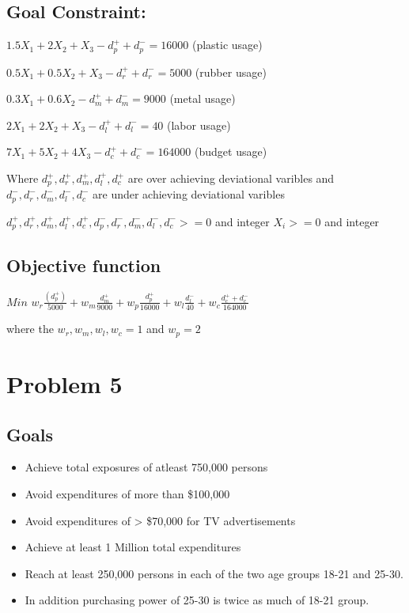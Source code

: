 \documentclass[]{article}
\providecommand{\tightlist}{%
  \setlength{\itemsep}{0pt}\setlength{\parskip}{0pt}}
\begin{document}
\subsection{Goal Constraint:}\label{goal-constraint}

\(1.5X_{1} + 2X_{2} + X_{3} - d_{p}^{+} + d_{p}^{-} = 16000\) (plastic
usage)

\(0.5X_{1} + 0.5X_{2} + X_{3} - d_{r}^{+} + d_{r}^{-} = 5000\) (rubber
usage)

\(0.3X_{1} + 0.6X_{2} - d_{m}^{+} + d_{m}^{-} = 9000\) (metal usage)

\(2X_{1} + 2X_{2} + X_{3} - d_{l}^{+} + d_{l}^{-} = 40\) (labor usage)

\(7X_{1} + 5X_{2} + 4X_{3} - d_{c}^{+} + d_{c}^{-} = 164000\) (budget
usage)

Where \(d_{p}^{+},d_{r}^{+},d_{m}^{+},d_{l}^{+},d_{c}^{+}\) are over
achieving deviational varibles and
\(d_{p}^{-},d_{r}^{-},d_{m}^{-},d_{l}^{-},d_{c}^{-}\) are under
achieving deviational varibles

\(d_{p}^{+},d_{r}^{+},d_{m}^{+},d_{l}^{+},d_{c}^{+},d_{p}^{-},d_{r}^{-},d_{m}^{-},d_{l}^{-},d_{c}^{-} >= 0\)
and integer \(X_{i} >= 0\) and integer

\subsection{Objective function}\label{objective-function-2}

\(Min\)
\(w_{r}\frac {(d_{p}^{+})}{5000} + w_{m} \frac {d_{m}^{+}}{9000} + w_{p} \frac {d_{p}^{+}}{16000} + w_{l}\frac{d_{l}^{-}}{40} + w_{c}\frac{d_{c}^{+}+d_{c}^{-}}{164000}\)

where the \(w_{r},w_{m},w_{l},w_{c} = 1\) and \(w_{p} = 2\)

\section{Problem 5}\label{problem-5}

\subsection{Goals}\label{goals-1}

\begin{itemize}
\tightlist
\item
  Achieve total exposures of atleast 750,000 persons
\item
  Avoid expenditures of more than \$100,000
\item
  Avoid expenditures of \textgreater{} \$70,000 for TV advertisements
\item
  Achieve at least 1 Million total expenditures
\item
  Reach at least 250,000 persons in each of the two age groups 18-21 and
  25-30.
\item
  In addition purchasing power of 25-30 is twice as much of 18-21 group.
\end{itemize}
\end{document}

